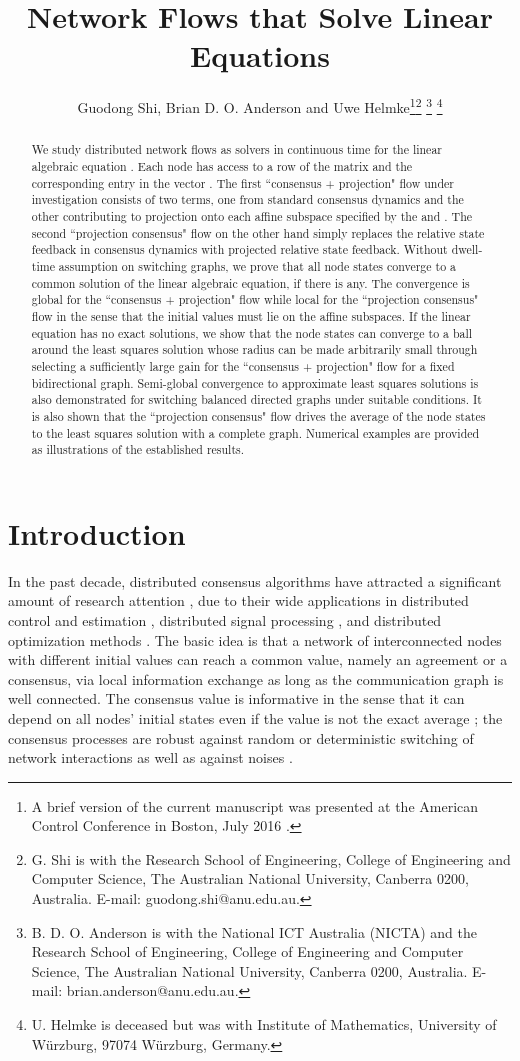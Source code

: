 \documentclass[a4paper, 11pt]{article}
\title{\bf Network  Flows that Solve Linear   Equations}
\author{Guodong Shi, Brian D. O. Anderson and Uwe Helmke\thanks{A brief version of the current manuscript  was presented at  the American Control Conference in Boston, July 2016 \cite{acc2016}.
}\thanks{G. Shi is with the Research School of Engineering, College of Engineering and Computer Science, The Australian National University, Canberra 0200, Australia. E-mail: guodong.shi@anu.edu.au.}
\thanks{B. D. O. Anderson is with the National ICT Australia (NICTA) and the Research School of Engineering, College of Engineering and Computer Science, The Australian National University, Canberra 0200, Australia. E-mail: brian.anderson@anu.edu.au.}
\thanks{U. Helmke is deceased but was  with  Institute of Mathematics, University of W\"{u}rzburg, 97074 W\"{u}rzburg, Germany. }}
\date{}
\begin{document}
\maketitle


\begin{abstract}
We study  distributed network flows as  solvers  in continuous time for the linear algebraic equation . Each node  has access to a row  of the matrix  and  the corresponding entry  in the vector . The first ``consensus + projection" flow under investigation  consists of two terms, one from standard consensus dynamics and the other contributing  to projection onto each affine subspace specified by the  and . The second ``projection consensus" flow on the other hand simply replaces the relative state feedback in consensus dynamics with projected relative state feedback.
Without  dwell-time assumption on switching graphs, we prove that all node states converge to a common solution of the linear algebraic equation, if there is any. The convergence is global for the ``consensus + projection" flow while local for the ``projection consensus" flow in the sense that the initial values must lie on the affine subspaces.  If the linear equation has no exact solutions, we show that the node states can converge to a ball around the least squares solution whose radius can be made arbitrarily small through selecting a sufficiently large gain for the ``consensus + projection" flow for a fixed bidirectional graph. Semi-global convergence to approximate least squares solutions is also demonstrated  for switching balanced directed graphs under suitable conditions. It is also shown that the ``projection consensus" flow drives the average of the node states to the least squares solution with a complete graph. Numerical examples are provided as illustrations of the established results.
\end{abstract}
\section{Introduction}

In the past decade, distributed consensus algorithms have attracted a significant amount of research attention \cite{jad03, xiao04,  saber04,  ren05}, due to their wide applications in distributed control and estimation \cite{martinez07,kar12}, distributed signal processing \cite{Rabbat2010}, and distributed optimization methods \cite{rabbat2004,nedic09}. The basic idea is that a network of interconnected nodes with different initial values can reach a common value, namely an  agreement or a consensus, via local information exchange as long as the communication graph is well connected. The consensus value is informative in the sense that it can depend on all nodes' initial states  even if the value is not the exact average \cite{jackson}; the consensus processes are robust against random or deterministic switching of network interactions as well as against noises \cite{moreau05, lin07, jad08, shisiam}.
\end{document}
